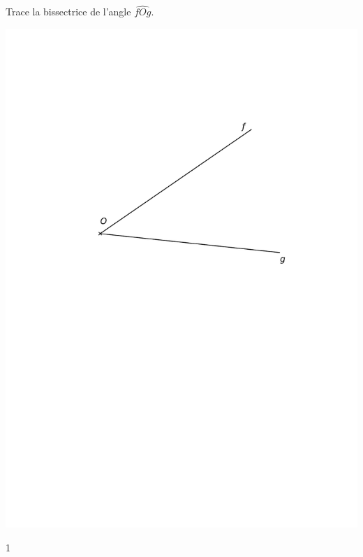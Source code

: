 \documentclass[a4paper,11pt]{report}
\begin{document}
\begin{exop}
{Trace la bissectrice de l'angle $\widehat{fOg}$.

\begin{center}
	\includegraphics[scale=1]{media/es-10/12-10}
\end{center}
\vspace{1cm}
%
}
{1}
\end{exop}
\end{document}
